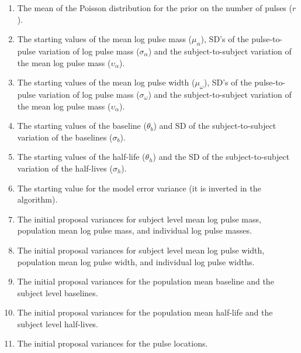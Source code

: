 \documentclass[12pt, oneside]{article}   	%
\begin{document}
\begin{enumerate}
\item The mean of the Poisson distribution for the prior on the number of pulses ($r$).
\item The starting values of the mean log pulse mass ($\mu_\alpha$), SD's of the pulse-to-pulse variation of log pulse mass ($\sigma_\alpha$) and the subject-to-subject variation of the mean log pulse mass ($\upsilon_\alpha$).
\item The starting values of the mean log pulse width ($\mu_\omega$), SD's of the pulse-to-pulse variation of log pulse mass ($\sigma_\omega$) and the subject-to-subject variation of the mean log pulse mass ($\upsilon_\alpha$).
\item The starting values of the baseline ($\theta_b$) and SD of the subject-to-subject variation of the baselines ($\sigma_b$).
\item The starting values of the half-life ($\theta_h$) and the SD of the subject-to-subject variation of the half-lives ($\sigma_h$).
\item The starting value for the model error variance (it is inverted in the algorithm).
\item The initial proposal variances for subject level mean log pulse mass, population mean log pulse mass, and individual log pulse masses.
\item The initial proposal variances for subject level mean log pulse width, population mean log pulse width, and individual log pulse widths.
\item The initial proposal variances for the population mean baseline and the subject level baselines.
\item The initial proposal variances for the population mean half-life and the subject level half-lives.
\item The initial proposal variances for the pulse locations.
\end{enumerate}
\end{document}
